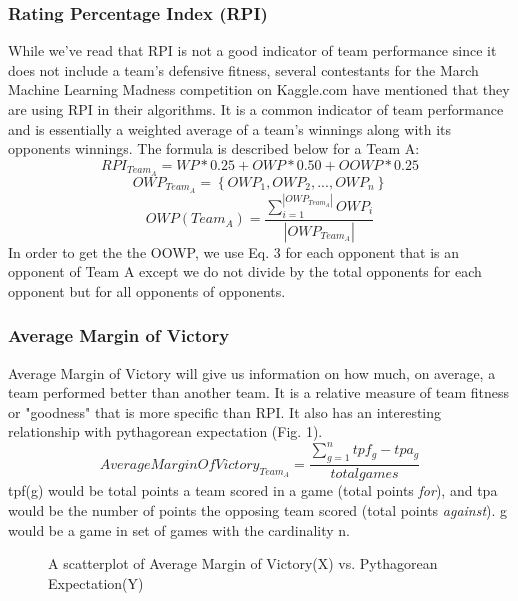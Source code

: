 \documentclass{acm_proc_article-sp}
\begin{document}
\subsubsection{Rating Percentage Index (RPI)}
While we've read that RPI is not a good indicator of team performance since it does not include a 
team's defensive fitness\cite{mozell}, several contestants for the March Machine Learning Madness 
competition on Kaggle.com have mentioned that they are using RPI in their algorithms.\cite{sonas, crowson, 
covalytics} It is a common indicator of team performance and is essentially a weighted average of a team's winnings along with its opponents winnings. The formula is described below for a Team A:
\begin{equation}
RPI_{Team_{A}} = WP * 0.25 + OWP *0.50 + OOWP * 0.25
\end{equation}
\begin{equation}
OWP_{Team_{A}} = \left \{ OWP_{1},OWP_{2},...,OWP_{n} \right \}
\end{equation}
\begin{equation}
OWP(Team_{A}) = \frac{\sum_{i=1}^{\left | OWP_{Team_{A}} \right |}OWP_{i}}{\left | OWP_{Team_{A}} \right |}
\end{equation}
In order to get the the OOWP, we use Eq. 3 for each opponent that is an opponent of Team A except we do not divide by the total opponents for each opponent but for all opponents of opponents.
\subsubsection{Average Margin of Victory}
Average Margin of Victory will give us information on how much, on average, a team performed better 
than another team. It is a relative measure of team fitness or "goodness" that is more specific than RPI. It also has an interesting relationship with 
pythagorean expectation (Fig. 1).
\begin{equation}
AverageMarginOfVictory_{Team_{A}} = \frac{\sum_{g=1}^{n}tpf_{g} - tpa_{g}}{totalgames}
\end{equation}
tpf(g) would be total points a team scored in a game (total points \emph{for}), and tpa would be the number of points the opposing team scored (total points \emph{against}).
g would be a game in set of games with the cardinality n.
\begin{figure}
\centering
{}
\caption{A scatterplot of Average Margin of Victory(X) vs. Pythagorean Expectation(Y)}
\end{figure}
\end{document}
